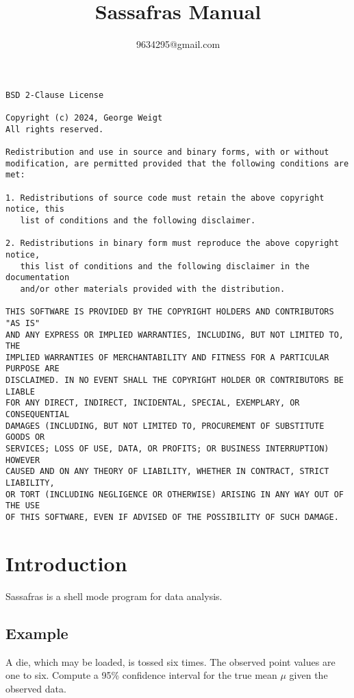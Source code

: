 \documentclass[12pt]{article}
\title{Sassafras Manual}
\author{9634295@gmail.com}
\date{}
\begin{document}
\maketitle
\newpage
\tableofcontents

\newpage
{\footnotesize\begin{verbatim}
BSD 2-Clause License

Copyright (c) 2024, George Weigt
All rights reserved.

Redistribution and use in source and binary forms, with or without
modification, are permitted provided that the following conditions are met:

1. Redistributions of source code must retain the above copyright notice, this
   list of conditions and the following disclaimer.

2. Redistributions in binary form must reproduce the above copyright notice,
   this list of conditions and the following disclaimer in the documentation
   and/or other materials provided with the distribution.

THIS SOFTWARE IS PROVIDED BY THE COPYRIGHT HOLDERS AND CONTRIBUTORS "AS IS"
AND ANY EXPRESS OR IMPLIED WARRANTIES, INCLUDING, BUT NOT LIMITED TO, THE
IMPLIED WARRANTIES OF MERCHANTABILITY AND FITNESS FOR A PARTICULAR PURPOSE ARE
DISCLAIMED. IN NO EVENT SHALL THE COPYRIGHT HOLDER OR CONTRIBUTORS BE LIABLE
FOR ANY DIRECT, INDIRECT, INCIDENTAL, SPECIAL, EXEMPLARY, OR CONSEQUENTIAL
DAMAGES (INCLUDING, BUT NOT LIMITED TO, PROCUREMENT OF SUBSTITUTE GOODS OR
SERVICES; LOSS OF USE, DATA, OR PROFITS; OR BUSINESS INTERRUPTION) HOWEVER
CAUSED AND ON ANY THEORY OF LIABILITY, WHETHER IN CONTRACT, STRICT LIABILITY,
OR TORT (INCLUDING NEGLIGENCE OR OTHERWISE) ARISING IN ANY WAY OUT OF THE USE
OF THIS SOFTWARE, EVEN IF ADVISED OF THE POSSIBILITY OF SUCH DAMAGE.
\end{verbatim}}
\newpage

\section{Introduction}

Sassafras is a shell mode program for data analysis.

\subsection*{Example}

A die, which may be loaded, is tossed six times.
The observed point values are one to six.
Compute a 95\% confidence interval for the true mean $\mu$
given the observed data.
\end{document}
